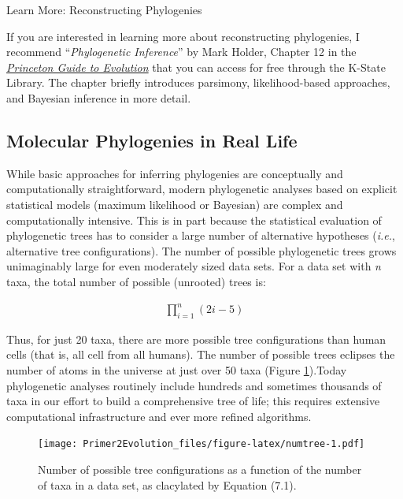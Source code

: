 \documentclass[
]{book}
\begin{document}
Learn More: Reconstructing Phylogenies

If you are interested in learning more about reconstructing phylogenies, I recommend ``\emph{Phylogenetic Inference}'' by Mark Holder, Chapter 12 in the \href{https://k-state.primo.exlibrisgroup.com/permalink/01KSU_INST/1177os2/alma9942417312002401}{\emph{Princeton Guide to Evolution}} that you can access for free through the K-State Library. The chapter briefly introduces parsimony, likelihood-based approaches, and Bayesian inference in more detail.

\hypertarget{molecular-phylogenies-in-real-life}{%
\subsection{Molecular Phylogenies in Real Life}\label{molecular-phylogenies-in-real-life}}

While basic approaches for inferring phylogenies are conceptually and computationally straightforward, modern phylogenetic analyses based on explicit statistical models (maximum likelihood or Bayesian) are complex and computationally intensive. This is in part because the statistical evaluation of phylogenetic trees has to consider a large number of alternative hypotheses (\emph{i.e.}, alternative tree configurations). The number of possible phylogenetic trees grows unimaginably large for even moderately sized data sets. For a data set with \emph{n} taxa, the total number of possible (unrooted) trees is:

\begin{align} 
\prod_{i=1}^{n}(2i-5) \label{eq:37}
\end{align}

Thus, for just 20 taxa, there are more possible tree configurations than human cells (that is, all cell from all humans). The number of possible trees eclipses the number of atoms in the universe at just over 50 taxa (Figure \ref{fig:numtree}).Today phylogenetic analyses routinely include hundreds and sometimes thousands of taxa in our effort to build a comprehensive tree of life; this requires extensive computational infrastructure and ever more refined algorithms.

\begin{figure}
\centering
\texttt{[image: Primer2Evolution\_files/figure-latex/numtree-1.pdf]}
\caption{\label{fig:numtree}Number of possible tree configurations as a function of the number of taxa in a data set, as clacylated by Equation (7.1).}
\end{figure}
\end{document}
